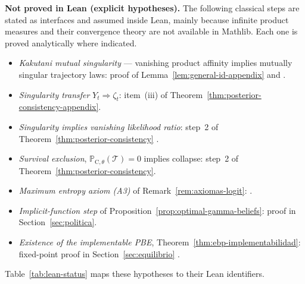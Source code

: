 \documentclass[ecta,nameyear,final,supplement]{econsocart}
\numberwithin{equation}{section}
\numberwithin{table}{section}
\theoremstyle{definition}
\newcommand{\ProbC}[1]{\mathbb{P}_{\mathrm{C},#1}}
\begin{document}
\medskip
\noindent\textbf{Not proved in Lean (explicit hypotheses).}
The following classical steps are stated as interfaces and assumed inside
Lean, mainly because infinite product measures and their convergence theory
are not available in Mathlib. Each one is proved analytically where indicated.
\begin{itemize}
  \item \emph{Kakutani mutual singularity} --- vanishing product affinity
  implies mutually singular trajectory laws: proof of
  Lemma~\ref{lem:general-id-appendix} and \citet{Kakutani1948}.
  \item \emph{Singularity transfer} $Y_t\Rightarrow\zeta_t$: item~(iii) of
  Theorem~\ref{thm:posterior-consistency-appendix}.
  \item \emph{Singularity implies vanishing likelihood ratio}: step~2 of
  Theorem~\ref{thm:posterior-consistency}
  \citep{BlackwellDubins1962,Schervish1995Theory}.
  \item \emph{Survival exclusion}, $\ProbC{\theta}(\mathcal{T})=0$ implies
  collapse: step~2 of Theorem~\ref{thm:posterior-consistency}.
  \item \emph{Maximum entropy axiom (A3)} of Remark~\ref{rem:axiomas-logit}:
  \citet{Jaynes1957Information}.
  \item \emph{Implicit-function step} of
  Proposition~\ref{prop:optimal-gamma-beliefs}: proof in
  Section~\ref{sec:politica}.
  \item \emph{Existence of the implementable PBE},
  Theorem~\ref{thm:ebp-implementabilidad}: fixed-point proof in
  Section~\ref{sec:equilibrio} \citep{Kakutani1941}.
\end{itemize}
Table~\ref{tab:lean-status} maps these hypotheses to their Lean identifiers.
\end{document}

